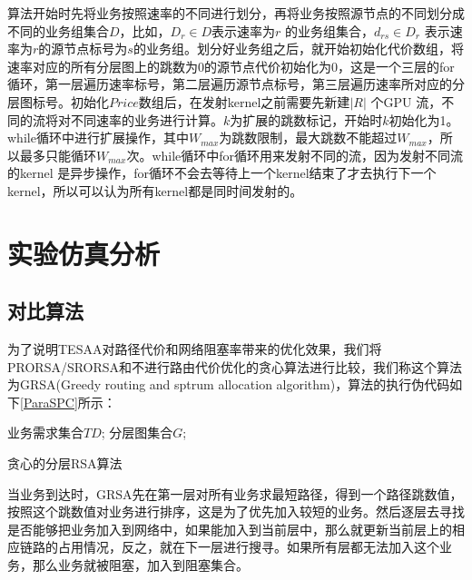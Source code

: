算法开始时先将业务按照速率的不同进行划分，再将业务按照源节点的不同划分成不同的业务组集合$D$，比如，$D_r \in D$表示速率为$r$ 的业务组集合，$d_{rs} \in D_r$ 表示速率为$r$的源节点标号为$s$的业务组。划分好业务组之后，就开始初始化代价数组，将速率对应的所有分层图上的跳数为0的源节点代价初始化为0，这是一个三层的for循环，第一层遍历速率标号，第二层遍历源节点标号，第三层遍历速率所对应的分层图标号。初始化$Price$数组后，在发射kernel之前需要先新建$|R|$ 个GPU 流，不同的流将对不同速率的业务进行计算。$k$为扩展的跳数标记，开始时$k$初始化为1。while循环中进行扩展操作，其中$W_{max}$为跳数限制，最大跳数不能超过$W_{max}$，所以最多只能循环$W_{max}$次。while循环中for循环用来发射不同的流，因为发射不同流的kernel 是异步操作，for循环不会去等待上一个kernel结束了才去执行下一个kernel，所以可以认为所有kernel都是同时间发射的。
\section{实验仿真分析}
\subsection{对比算法}
为了说明TESAA对路径代价和网络阻塞率带来的优化效果，我们将PRORSA/SRORSA和不进行路由代价优化的贪心算法进行比较，我们称这个算法为GRSA(Greedy routing and sptrum allocation algorithm)，算法的执行伪代码如下\ref{ParaSPC}所示：
\begin{algorithm}[t]
\begin{algorithmic}[1]
\Require
业务需求集合$TD$;
分层图集合$G$;
\EndIf
\EndFor
{}
\EndIf
\EndFor
\EndFor
\EndFor
\end{algorithmic}
\caption{{贪心的分层RSA算法}}
\label{ParaSPC}
\end{algorithm}

当业务到达时，GRSA先在第一层对所有业务求最短路径，得到一个路径跳数值，按照这个跳数值对业务进行排序，这是为了优先加入较短的业务。然后逐层去寻找是否能够把业务加入到网络中，如果能加入到当前层中，那么就更新当前层上的相应链路的占用情况，反之，就在下一层进行搜寻。如果所有层都无法加入这个业务，那么业务就被阻塞，加入到阻塞集合。
